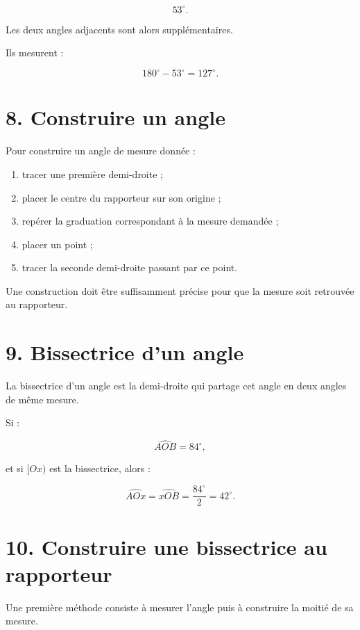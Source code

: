 \[
53^\circ.
\]

Les deux angles adjacents sont alors supplémentaires.

Ils mesurent :

\[
180^\circ-53^\circ=127^\circ.
\]

\section{8. Construire un angle}

Pour construire un angle de mesure donnée :

\begin{enumerate}
\item tracer une première demi-droite ;
\item placer le centre du rapporteur sur son origine ;
\item repérer la graduation correspondant à la mesure demandée ;
\item placer un point ;
\item tracer la seconde demi-droite passant par ce point.
\end{enumerate}

Une construction doit être suffisamment précise pour que la mesure soit retrouvée au rapporteur.

\section{9. Bissectrice d’un angle}

La bissectrice d’un angle est la demi-droite qui partage cet angle en deux angles de même mesure.


Si :

\[
\widehat{AOB}=84^\circ,
\]

et si $[Ox)$ est la bissectrice, alors :

\[
\widehat{AOx}
=
\widehat{xOB}
=
\dfrac{84^\circ}{2}
=
42^\circ.
\]

\section{10. Construire une bissectrice au rapporteur}

Une première méthode consiste à mesurer l’angle puis à construire la moitié de sa mesure.

